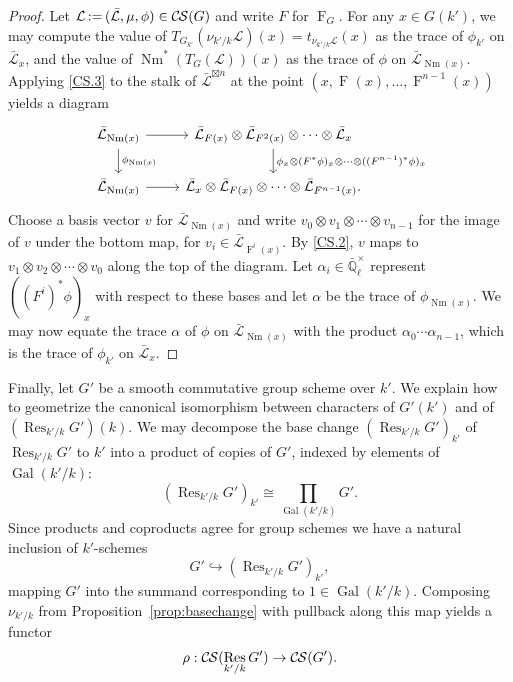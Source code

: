 \documentclass[10pt]{amsart}
\theoremstyle{plain}
\theoremstyle{definition}
\theoremstyle{remark}
\newcommand{\EE}{\mathbb{\bar Q}_\ell}
\newcommand{\EEx}{\EE^\times}
\DeclareMathOperator{\Gal}{Gal}
\newcommand{\Frob}[1]{\operatorname{F}_{#1}}
\DeclareMathOperator{\Res}{Res}
\DeclareMathOperator{\Nm}{Nm}
\newcommand{\ceq}{{\, :=\, }}
\newcommand{\TrFrob}[1]{T_{#1}}
\newcommand{\cs}[1]{{\mathcal{#1}}}
\newcommand{\gcs}[1]{{\mathcal{\bar #1}}}
\newcommand{\CS}{{\mathcal{C\hskip-0.8pt S}}}
\begin{document}
\begin{proof}
Let $\cs{L} \ceq (\gcs{L}, \mu, \phi) \in \CS(G)$ and write $F$ for $\Frob{G}$.  For any $x \in G(k')$,
we may compute the value of $\TrFrob{G_{k'}}(\nu_{k'/k}\cs{L})(x)= t_{\nu_{k'/k}\cs{L}}(x)$ as the trace of $\phi_{k'}$ on $\gcs{L}_x$,
and the value of $\Nm^*(\TrFrob{G}(\cs{L}))(x)$ as the trace of $\phi$ on $\gcs{L}_{\Nm(x)}$.
Applying \ref{CS.3} to the stalk of $\gcs{L}^{\boxtimes n}$ at the point $(x, \Frob{}(x), \ldots, \Frob{}^{n-1}(x))$ yields a diagram
\[
\begin{tikzcd}
\gcs{L}_{\Nm(x)} \rar \dar{\phi_{\Nm(x)}} & \gcs{L}_{F(x)} \otimes \gcs{L}_{F^2(x)} \otimes \cdots \otimes \gcs{L}_x
\dar{\phi_x \otimes (F^*\phi)_x \otimes \cdots \otimes ((F^{n-1})^*\phi)_x} \\
\gcs{L}_{\Nm(x)} \rar & \gcs{L}_x \otimes \gcs{L}_{F(x)} \otimes \cdots \otimes \gcs{L}_{F^{n-1}(x)}.
\end{tikzcd}
\]
Choose a basis vector $v$ for $\gcs{L}_{\Nm(x)}$ and write $v_0 \otimes v_1 \otimes \cdots \otimes v_{n-1}$ for the image of $v$ under the
bottom map,
for $v_i \in \gcs{L}_{\Frob{}^i(x)}$.  By \ref{CS.2}, $v$ maps to
$v_1 \otimes v_2 \otimes \cdots \otimes v_0$ along the top of the diagram.
Let $\alpha_i \in \EEx$ represent $((F^i)^*\phi)_x$ with respect to these bases and let $\alpha$ be
the trace of $\phi_{\Nm(x)}$.  We may now equate the trace $\alpha$ of $\phi$ on $\gcs{L}_{\Nm(x)}$
with the product $\alpha_0 \cdots \alpha_{n-1}$, which is the trace of $\phi_{k'}$ on $\gcs{L}_x$.
\end{proof}

Finally, let $G'$ be a smooth commutative group scheme over $k'$.
We explain how to geometrize the canonical isomorphism between characters of $G'(k')$ and of $(\Res_{k'/k}G')(k)$.
We may decompose the base change $(\Res_{k'/k}G')_{k'}$ of $\Res_{k'/k}G'$ to $k'$
into a product of copies of $G'$, indexed by elements of $\Gal(k'/k)$:
\[
(\Res_{k'/k}G')_{k'} \cong \prod_{\Gal(k'/k)} G'.
\]
Since products and coproducts agree for group schemes we have a natural inclusion of $k'$-schemes
\[
G' \hookrightarrow (\Res_{k'/k}G')_{k'},
\]
mapping $G'$ into the summand corresponding to $1 \in \Gal(k'/k)$.  Composing $\nu_{k'/k}$
from Proposition~\ref{prop:basechange} with pullback along this map yields a functor
\[
\rho : \CS(\Res_{k'/k}G') \to \CS(G').
\]
\end{document}
